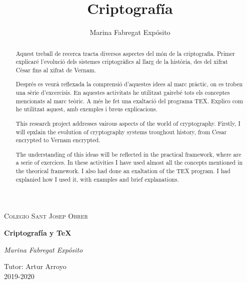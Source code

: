 \documentclass{article}
\title{\Huge \textbf{Criptografía}}
\author{Marina Fabregat Expósito}
\date{}
\begin{document}

\begin{titlepage}
\centering
{\scshape \LARGE Colegio Sant Josep Obrer \par}
\vspace{1.5cm}
{\huge \bfseries Criptografía y \TeX \par}
\vspace{2cm}



\vfill %
{\Large \itshape Marina Fabregat Expósito \par}

Tutor: Artur Arroyo \\

2019-2020

\end{titlepage}




\vfill

\begin{abstract}
\justify
Aquest treball de recerca tracta diversos aspectes del món de la criptografia. Primer explicaré l'evolució dels sistemes criptogràfics al llarg de la història, des del xifrat Cèsar fins al xifrat de Vernam. 
 
Després es veurà reflexada la comprensió d'aquestes idees al marc pràctic, on es troben una sèrie d'excercisis. En aquestes activitats he utilitzat gairebé tots els conceptes mencionats al marc teòric. A més he fet una exaltació del programa TEX. Explico com he utilitzat aquest, amb exemples i breus explicacions. 
 

 
 \vspace{10mm} %
 \justify
 This research project addresses vairous aspects of the world of cryptography. Firstly, I will epxlain the evolution of cryptography systems troughout history, from Cesar encrypted to Vernam encrypted.
 
 The understanding of this ideas will be reflected in the practical framework, where are a serie of exercices. In these activities I have used almost all the concepts mentioned in the theorical framework. I also had done an exaltation of the TEX program. I had explanied how I used it, with examples and brief explanations.
 
\end{abstract}
\end{document}
